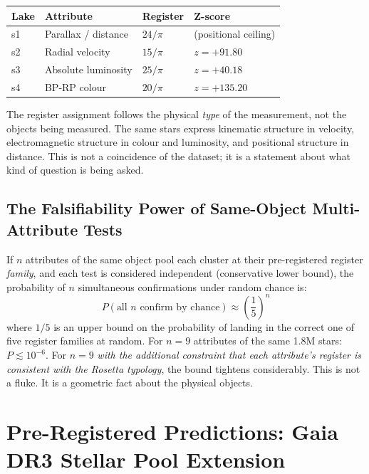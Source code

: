 \documentclass[12pt,a4paper]{article}
\begin{document}
\begin{center}
\begin{tabular}{llll}
\toprule
Lake & Attribute & Register & Z-score \\
\midrule
s1 & Parallax / distance & $24/\pi$ & (positional ceiling) \\
s2 & Radial velocity & $15/\pi$ & $z = +91.80$ \\
s3 & Absolute luminosity & $25/\pi$ & $z = +40.18$ \\
s4 & BP-RP colour & $20/\pi$ & $z = +135.20$ \\
\bottomrule
\end{tabular}
\end{center}

The register assignment follows the physical \emph{type} of the measurement, not
the objects being measured. The same stars express kinematic structure in
velocity, electromagnetic structure in colour and luminosity, and positional
structure in distance. This is not a coincidence of the dataset; it is a
statement about what kind of question is being asked.

\subsection{The Falsifiability Power of Same-Object Multi-Attribute Tests}

If $n$ attributes of the same object pool each cluster at their pre-registered
register \emph{family}, and each test is considered independent (conservative
lower bound), the probability of $n$ simultaneous confirmations under random
chance is:
\begin{equation}
  P(\text{all } n \text{ confirm by chance}) \approx \left(\frac{1}{5}\right)^n
\end{equation}
where $1/5$ is an upper bound on the probability of landing in the correct one
of five register families at random. For $n = 9$ attributes of the same 1.8M
stars: $P \lesssim 10^{-6}$. For $n = 9$ \emph{with the additional constraint
that each attribute's register is consistent with the Rosetta typology}, the
bound tightens considerably. This is not a fluke. It is a geometric fact about
the physical objects.

\section{Pre-Registered Predictions: Gaia DR3 Stellar Pool Extension}
\label{sec:gaia}
\end{document}
